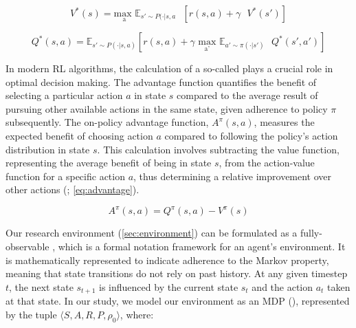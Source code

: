    \begin{equation}
        V^{*}(s) = \underset{\text{a}}{\text{max }} \mathbb{E}_{s' \sim P(\cdot | s, a} \text{ } [r(s,a) + \gamma \text{ }V^{*}(s')]
        \label{eq:bellman-optimal-value}
    \end{equation}
    
    \begin{equation}
        Q^{*}(s, a) = \mathbb{E}_{s' \sim P(\cdot | s, a)} [r(s,a) + \gamma \underset{\text{a'}}{\text{ max }} \mathbb{E}_{a' \sim \pi(\cdot | s')} \text{ } Q^{*}(s', a')]
        \label{eq:bellman-optimal-action-value}
    \end{equation}
    
    \noindent In modern RL algorithms, the calculation of a so-called  plays a crucial role in optimal decision making. The advantage function quantifies the benefit of selecting a particular action $a$ in state $s$ compared to the average result of pursuing other available actions in the same state, given adherence to policy $\pi$ subsequently. The on-policy advantage function, $A^{\pi}(s, a)$, measures the expected benefit of choosing action $a$ compared to following the policy's action distribution in state $s$. This calculation involves subtracting the value function, representing the average benefit of being in state $s$, from the action-value function for a specific action $a$, thus determining a relative improvement over other actions (\textcolor{deepblue}{\cite{Sutton1998}; \autoref{eq:advantage}}). 
    
    \begin{equation}
        A^{\pi}(s, a) = Q^{\pi}(s, a) - V^{\pi}(s)
        \label{eq:advantage}
    \end{equation}
    
    \noindent Our research environment (\autoref{sec:environment}) can be formulated as a fully-observable , which is a formal notation framework for an agent's environment. It is mathematically represented to indicate adherence to the Markov property, meaning that state transitions do not rely on past history. At any given timestep $t$, the next state $s_{t+1}$ is influenced by the current state $s_t$ and the action $a_t$ taken at that state. In our study, we model our environment as an MDP (\textcolor{deepblue}{\cite{SpinningUp2018}}), represented by the tuple $\langle S, A, R, P, \rho_0 \rangle$, where:
    
    \vspace{-5pt}
    
